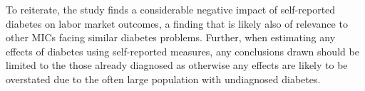 \documentclass[12pt,english,british]{article}
\begin{document}
To reiterate, the study finds a considerable negative impact of self-reported diabetes on labor market outcomes, a finding that is likely also of relevance to other \ac{MICs} facing similar diabetes problems. Further, when estimating any effects of diabetes using self-reported measures, any conclusions drawn should be limited to the those already diagnosed as otherwise any effects are likely to be overstated due to the often large population with undiagnosed diabetes.


\noindent  

%


\end{document}
